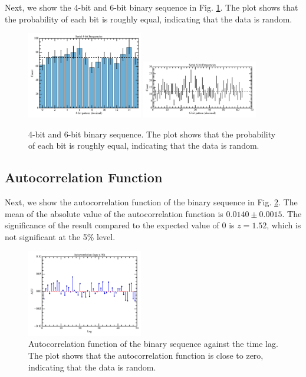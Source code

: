 Next, we show the 4-bit and 6-bit binary sequence in Fig. \ref{fig:serial_4bit_6bit}. The plot shows that the probability of each bit is roughly equal, indicating that the data is random.
\begin{figure}
\centering
\includegraphics[width=0.45\textwidth]{figure/serial4.png}
\includegraphics[width=0.45\textwidth]{figure/serial6.png}
\caption{4-bit and 6-bit binary sequence. The plot shows that the probability of each bit is roughly equal, indicating that the data is random.}
\label{fig:serial_4bit_6bit}
\end{figure}


\subsection{Autocorrelation Function}
Next, we show the autocorrelation function of the binary sequence in Fig. \ref{fig:autocorrelation}. The mean of the absolute value of the autocorrelation function is $0.0140 \pm 0.0015$. The significance of the result compared to the expected value of 0 is $z=1.52$, which is not significant at the 5\% level. 
\begin{figure}
\centering
\includegraphics[width=0.45\textwidth]{figure/acf_bits.png}
\caption{Autocorrelation function of the binary sequence against the time lag. The plot shows that the autocorrelation function is close to zero, indicating that the data is random.}
\label{fig:autocorrelation}
\end{figure}

